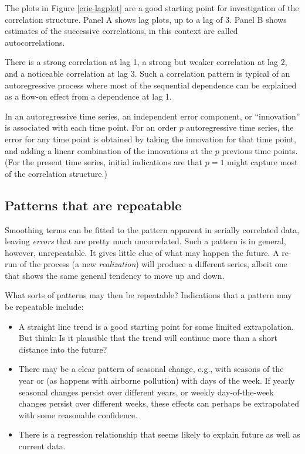 
The plots in Figure \ref{erie-lagplot} are a good starting point for
investigation of the correlation structure.  Panel A shows lag plots,
up to a lag of 3.  Panel B shows estimates of the successive
correlations, in this context are called autocorrelations.

There is a strong correlation at lag 1, a strong but weaker
correlation at lag 2, and a noticeable correlation at lag 3.  Such
a correlation pattern is typical of an autoregressive process where
most of the sequential dependence can be explained as a flow-on
effect from a dependence at lag 1.

In an autoregressive time series, an  independent error component, or ``innovation'' is
associated with each time point. For an order $p$ autoregressive time
series, the error for any time point is obtained by taking the
innovation for that time point, and adding a linear combination of the
innovations at the $p$ previous time points.  (For the present time
series, initial indications are that $p=1$ might capture most of the
correlation structure.)

\subsection{Patterns that are repeatable}

Smoothing terms can be fitted to the pattern apparent in
  serially correlated data, leaving {\em errors} that are pretty much
  uncorrelated.  Such a pattern is in general, however, unrepeatable.
  It gives little clue of what may happen the future.  A re-run of
  the process (a new {\em realization}) will produce a different
  series, albeit one that shows the same general tendency to move up
  and down.

What sorts of patterns may then be repeatable?  Indications that a
pattern may be repeatable include:
\begin{itemize}
\item A straight line trend is a good starting point for some
  limited extrapolation. But think: Is it plausible that the trend
  will continue more than a short distance into the future?
\item There may be a clear pattern of seasonal change, e.g.,
with seasons of the year or (as happens with airborne pollution)
with days of the week. If yearly seasonal changes persist over
different years, or weekly day-of-the-week changes persist over
different weeks, these effects can perhaps be extrapolated with
some reasonable confidence.
\item There is a regression relationship that seems likely to
explain future as well as current data.
\end{itemize}

